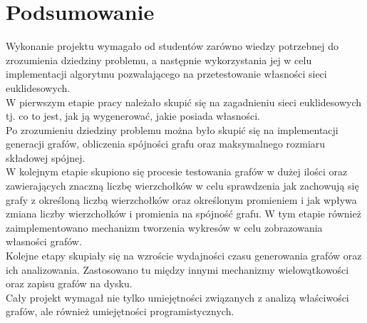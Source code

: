 
\chapter{Podsumowanie}
	\label{podsumowanie}

	Wykonanie projektu wymagało od studentów zarówno wiedzy potrzebnej do zrozumienia dziedziny problemu, a następnie wykorzystania jej w celu implementacji algorytmu pozwalającego na przetestowanie własności sieci euklidesowych.\\
	W pierwszym etapie pracy należało skupić się na zagadnieniu sieci euklidesowych tj. co to jest, jak ją wygenerować, jakie posiada własności.\\
	Po zrozumieniu dziedziny problemu można było skupić się na implementacji generacji grafów, obliczenia spójności grafu oraz maksymalnego rozmiaru składowej spójnej.\\
	W kolejnym etapie skupiono się procesie testowania grafów w dużej ilości oraz zawierających znaczną liczbę wierzchołków w celu sprawdzenia jak zachowują się grafy z określoną liczbą wierzchołków oraz określonym promieniem i jak wpływa zmiana liczby wierzchołków i promienia na spójność grafu. W tym etapie również zaimplementowano mechanizm tworzenia wykresów w celu zobrazowania własności grafów.\\
	Kolejne etapy skupiały się na wzroście wydajności czasu generowania grafów oraz ich analizowania. Zastosowano tu między innymi mechanizmy wielowątkowości oraz zapisu grafów na dysku.\\
	Cały projekt wymagał nie tylko umiejętności związanych z analizą właściwości grafów, ale również umiejętności programistycznych.
